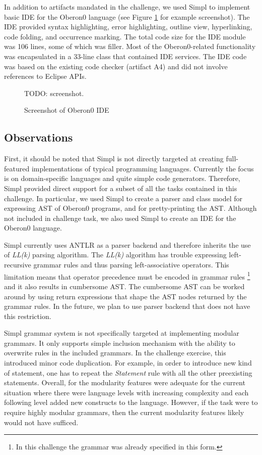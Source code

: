 In addition to artifacts mandated in the challenge, we used Simpl
to implement basic IDE for the Oberon0 language (see Figure \ref{fig:Screenshot-of-Oberon0}
for example screenshot). The IDE provided syntax highlighting, error
highlighting, outline view, hyperlinking, code folding, and occurrence
marking. The total code size for the IDE module was 106 lines, some
of which was filler. Most of the Oberon0-related functionality was
encapsulated in a 33-line class that contained IDE services. The IDE
code was based on the existing code checker (artifact A4) and did
not involve references to Eclipse APIs. 

%
\begin{figure}[!h]
TODO: screenshot.

\caption{\label{fig:Screenshot-of-Oberon0}Screenshot of Oberon0 IDE}

\end{figure}





\subsection{Observations}

First, it should be noted that Simpl is not directly targeted at creating
full-featured implementations of typical programming languages. Currently
the focus is on domain-specific languages and quite simple code generators.
Therefore, Simpl provided direct support for a subset of all the tasks
contained in this challenge. In particular, we used Simpl to create
a parser and class model for expressing AST of Oberon0 programs, and
for pretty-printing the AST. Although not included in challenge task,
we also used Simpl to create an IDE for the Oberon0 language.

Simpl currently uses ANTLR as a parser backend and therefore inherits
the use of \emph{LL(k)} parsing algorithm. The \emph{LL(k)} algorithm
has trouble expressing left-recursive grammar rules and thus parsing
left-associative operators. This limitation means that operator precedence
must be encoded in grammar rules%
\footnote{In this challenge the grammar was already specified in this form.%
} and it also results in cumbersome AST. The cumbersome AST can be
worked around by using return expressions that shape the AST nodes
returned by the grammar rules. In the future, we plan to use parser
backend that does not have this restriction.

Simpl grammar system is not specifically targeted at implementing
modular grammars. It only supports simple inclusion mechanism with
the ability to overwrite rules in the included grammars. In the challenge
exercise, this introduced minor code duplication. For example, in
order to introduce new kind of statement, one has to repeat the \emph{Statement}
rule with all the other preexisting statements. Overall, for the modularity
features were adequate for the current situation where there were
language levels with increasing complexity and each following level
added new constructs to the language. However, if the task were to
require highly modular grammars, then the current modularity features
likely would not have sufficed.


